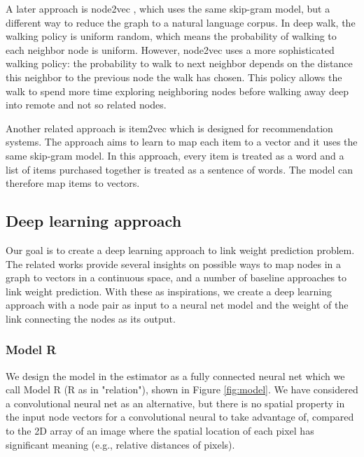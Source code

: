 \documentclass{article}
\begin{document}
A later approach is node2vec \cite{grovernode2vec},
which uses the same skip-gram model, 
but a different way to reduce the graph to a natural language corpus.
In deep walk, the walking policy is uniform random,
which means the probability of walking to each neighbor node is uniform.
However, node2vec uses a more sophisticated walking policy:
the probability to walk to next neighbor depends on
the distance this neighbor to the previous node the walk has chosen.
This policy allows the walk to spend more time exploring neighboring nodes
before walking away deep into remote and not so related nodes.

Another related approach is item2vec \cite{barkan2016item2vec}
which is designed for recommendation systems.
The approach aims to learn to map each item to a vector
and it uses the same skip-gram model.
In this approach, every item is treated as a word and
a list of items purchased together is treated as a sentence of words.
The model can therefore map items to vectors.

\subsection{Deep learning approach}
Our goal is to create a deep learning approach to link weight prediction problem.
The related works provide several insights on possible ways 
to map nodes in a graph to vectors in a continuous space,
and a number of baseline approaches to link weight prediction.
With these as inspirations,
we create a deep learning approach with a node pair as input to a neural net model
and the weight of the link connecting the nodes as its output.

\subsubsection{Model R}
We design the model in the estimator as a fully connected neural net which we call Model R (R as in "relation"), shown in Figure \ref{fig:model}.
We have considered a convolutional neural net as an alternative,
but there is no spatial property in the input node vectors
for a convolutional neural to take advantage of,
compared to the 2D array of an image where the spatial location of each pixel
has significant meaning (e.g., relative distances of pixels).
\end{document}
